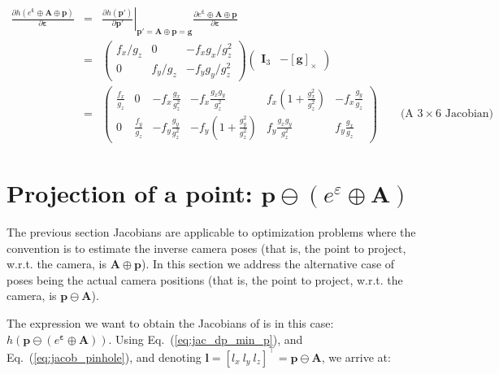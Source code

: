 \documentclass[a4paper,11pt]{report}
\newcommand{\E}{{\bm{\varepsilon}}}
\newcommand{\A}{{\mathbf{A}}}
\begin{document}
\begin{eqnarray}
\frac{\partial h(e^\E \oplus \A \oplus \mathbf{p})}{\partial \mathbf{\E}} 
&=& 
\left. \frac{\partial h(\mathbf{p'})}{\partial \mathbf{p'}} \right|_{ \mathbf{p'} = \A \oplus \mathbf{p} = \mathbf{g} }
\frac{\partial e^\E \oplus \A \oplus \mathbf{p} }{\partial \E} \\
&=& 
\left(
\begin{array}{ccc}
 f_x / g_z   &    0    &  -f_x g_x / g_z^2   \\
 0 & f_y / g_z  &  -f_y g_y / g_z^2   
\end{array}
\right)
\left(
\begin{array}{cc}
 \mathbf{I}_3   & - \left[ \mathbf{g} \right]_\times
\end{array}
\right) \\
&=&
\left(
\begin{array}{cccccc}
 \frac{f_x}{g_z}  & 
 0 &
 -f_x\frac{g_x}{g_z^2} &
 -f_x \frac{g_x g_y}{g_z^2} &
  f_x  (1 + \frac{g_x^2}{g_z^2} )  &
 -f_x \frac{g_y}{g_z} 
\\
 0 & 
 \frac{f_y}{g_z}  & 
 -f_y\frac{g_y}{g_z^2} 
 &
  -f_y (1 + \frac{g_y^2}{g_z^2}) &
  f_y \frac{g_x g_y}{g_z^2} &
  f_y \frac{g_x}{g_z}
\end{array}
\right)
\quad\quad \text{(A $3 \times 6$ Jacobian)} \nonumber
\end{eqnarray}



\newpage

\section{Projection of a point: $\mathbf{p} \ominus (e^\varepsilon \oplus \mathbf{A})$}

The previous section Jacobians are applicable to optimization problems 
where the convention is to estimate the inverse camera poses 
(that is, the point to project, w.r.t. the camera, is $\A \oplus \mathbf{p}$).
In this section we address the alternative case of poses being the actual 
camera positions
(that is, the point to project, w.r.t. the camera, is $\mathbf{p} \ominus \A$).

The expression we want to obtain the Jacobians of is in this case: 
$h(\mathbf{p} \ominus (e^\E \oplus \A))$.
Using Eq.~(\ref{eq:jac_dp_min_p}),
and  Eq.~(\ref{eq:jacob_pinhole}),
and denoting $\mathbf{l}=[l_x ~ l_y ~ l_z]^\top=\mathbf{p} \ominus \A$, 
we arrive at:
\end{document}
